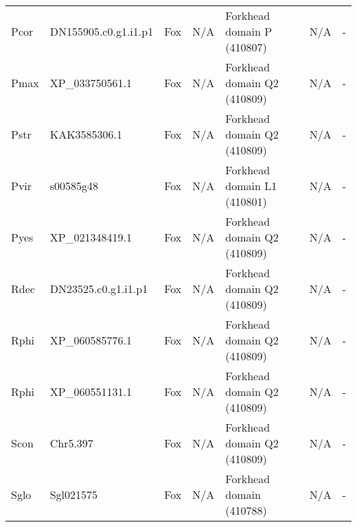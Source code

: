 \documentclass[../main.tex]{subfiles}
\begin{document}
\begin{landscape}
\begin{longtable}{lllllll}
		Pcor           & DN155905.c0.g1.i1.p1  & Fox            & N/A                 & Forkhead domain P (410807)                  & N/A                                                                    & -                    \\
		Pmax           & XP\_033750561.1       & Fox            & N/A                 & Forkhead domain Q2 (410809)                 & N/A                                                                    & -                    \\
		Pstr           & KAK3585306.1          & Fox            & N/A                 & Forkhead domain Q2 (410809)                 & N/A                                                                    & -                    \\
		Pvir           & s00585g48             & Fox            & N/A                 & Forkhead domain L1 (410801)                 & N/A                                                                    & -                    \\
		Pyes           & XP\_021348419.1       & Fox            & N/A                 & Forkhead domain Q2 (410809)                 & N/A                                                                    & -                    \\
		Rdec           & DN23525.c0.g1.i1.p1   & Fox            & N/A                 & Forkhead domain Q2 (410809)                 & N/A                                                                    & -                    \\
		Rphi           & XP\_060585776.1       & Fox            & N/A                 & Forkhead domain Q2 (410809)                 & N/A                                                                    & -                    \\
		Rphi           & XP\_060551131.1       & Fox            & N/A                 & Forkhead domain Q2 (410809)                 & N/A                                                                    & -                    \\
		Scon           & Chr5.397              & Fox            & N/A                 & Forkhead domain Q2 (410809)                 & N/A                                                                    & -                    \\
		Sglo           & Sgl021575             & Fox            & N/A                 & Forkhead domain (410788)                    & N/A                                                                    & -                    \\

\end{longtable}
\end{landscape}
\end{document}

